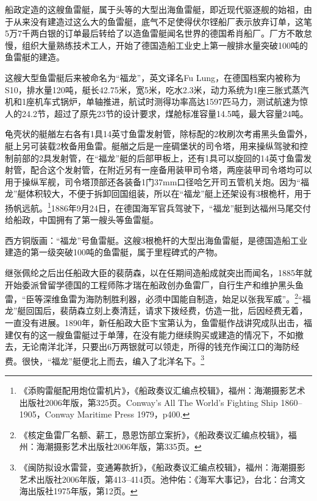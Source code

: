 \documentclass[12pt,UTF8]{ctexbook}
\begin{document}
船政定造的这艘鱼雷艇，属于头等的大型出海鱼雷艇，即近现代驱逐舰的始祖，由于从来没有建造过这么大的鱼雷艇，底气不足使得伏尔铿船厂表示放弃订单，这笔5万7千两白银的订单最后转给了以造鱼雷艇闻名世界的德国希肖船厂。厂方不敢怠慢，组织大量熟练技术工人，开始了德国造船工业史上第一艘排水量突破100吨的鱼雷艇的建造。

这艘大型鱼雷艇后来被命名为“福龙”，英文译名Fu Lung，在德国档案内被称为S10，排水量120吨，艇长42.75米，宽5米，吃水2.3米，动力系统为1座三胀式蒸汽机和1座机车式锅炉，单轴推进，航试时测得功率高达1597匹马力，测试航速为惊人的24.2节，超过了原先23节的设计要求，煤舱标准容量14.5吨，最大容量24吨。

龟壳状的艇艏左右各有1具14英寸鱼雷发射管，除标配的2枚刷次考甫黑头鱼雷外，艇上另可装载2枚备用鱼雷。艇艏之后是一座碉堡状的司令塔，用来操纵驾驶和控制前部的2具发射管，在“福龙”艇的后部甲板上，还有1具可以旋回的14英寸鱼雷发射管，配合这个发射管，在附近另有一座备用装甲司令塔，两座装甲司令塔均可以用于操纵军舰，司令塔顶部还各装备1门37mm口径哈乞开司五管机关炮。因为“福龙”艇体积较大，不便于拆卸回国组装，所以在“福龙”艇上还架设有3根桅杆，用于扬帆远航。\footnote{《添购雷艇配用炮位雷机片》，《船政奏议汇编点校辑》，福州：海潮摄影艺术出版社2006年版，第325页。Conway's All The World's Fighting Ship 1860--1905，Conway Maritime Press 1979，p400.}1886年9月24日，在德国海军官兵驾驶下，“福龙”艇到达福州马尾交付给船政，中国拥有了第一艘头等鱼雷艇。

西方铜版画：“福龙”号鱼雷艇。这艘3根桅杆的大型出海鱼雷艇，是德国造船工业建造的第一级突破100吨的鱼雷艇，属于里程碑式的产物。

继张佩纶之后出任船政大臣的裴荫森，以在任期间造船成就突出而闻名，1885年就开始委派曾留学德国的工程师陈才瑞在船政创办鱼雷厂，自行生产和维护黑头鱼雷，“臣等深维鱼雷为海防制胜利器，必须中国能自制造，始足以张我军威”。\footnote{《核定鱼雷厂名额、薪工，恳恩饬部立案折》，《船政奏议汇编点校辑》，福州：海潮摄影艺术出版社2006年版，第335页。}“福龙”艇回国后，裴荫森立刻上奏清廷，请求下拨经费，仿造一批，后因经费无着，一直没有进展。1890年，新任船政大臣卞宝第认为，鱼雷艇作战讲究成队出击，福建仅有的这一艘鱼雷艇过于单薄，在没有能力继续购买或建造的情况下，不如撤去，无论南洋北洋，只要出6万两银就可以领走，所得的钱充作闽江口的海防经费。很快，“福龙”艇便北上而去，编入了北洋名下。\footnote{《闽防拟设水雷营，变通筹款折》，《船政奏议汇编点校辑》，福州：海潮摄影艺术出版社2006年版，第413--414页。池仲佑：《海军大事记》，台北：台湾文海出版社1975年版，第12页。}
\end{document}
